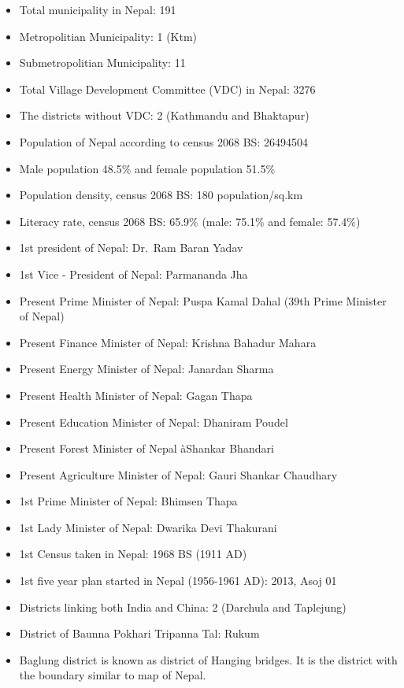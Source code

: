 \documentclass[
  openany]{book}
\providecommand{\tightlist}{%
  \setlength{\itemsep}{0pt}\setlength{\parskip}{0pt}}
\begin{document}
\begin{itemize}
\tightlist
\item
  Total municipality in Nepal: 191
\item
  Metropolitian Municipality: 1 (Ktm)
\item
  Submetropolitian Municipality: 11
\item
  Total Village Development Committee (VDC) in Nepal: 3276
\item
  The districts without VDC: 2 (Kathmandu and Bhaktapur)
\item
  Population of Nepal according to census 2068 BS: 26494504
\item
  Male population 48.5\% and female population 51.5\%
\item
  Population density, census 2068 BS: 180 population/sq.km
\item
  Literacy rate, census 2068 BS: 65.9\% (male: 75.1\% and female: 57.4\%)
\item
  1st president of Nepal: Dr.~Ram Baran Yadav
\item
  1st Vice - President of Nepal: Parmananda Jha
\item
  Present Prime Minister of Nepal: Puspa Kamal Dahal (39th Prime Minister of Nepal)
\item
  Present Finance Minister of Nepal: Krishna Bahadur Mahara
\item
  Present Energy Minister of Nepal: Janardan Sharma
\item
  Present Health Minister of Nepal: Gagan Thapa
\item
  Present Education Minister of Nepal: Dhaniram Poudel
\item
  Present Forest Minister of Nepal àShankar Bhandari
\item
  Present Agriculture Minister of Nepal: Gauri Shankar Chaudhary
\item
  1st Prime Minister of Nepal: Bhimsen Thapa
\item
  1st Lady Minister of Nepal: Dwarika Devi Thakurani
\item
  1st Census taken in Nepal: 1968 BS (1911 AD)
\item
  1st five year plan started in Nepal (1956-1961 AD): 2013, Asoj 01
\item
  Districts linking both India and China: 2 (Darchula and Taplejung)
\item
  District of Baunna Pokhari Tripanna Tal: Rukum
\item
  Baglung district is known as district of Hanging bridges. It is the district with the boundary similar to map of Nepal.

\end{itemize}
\end{document}

